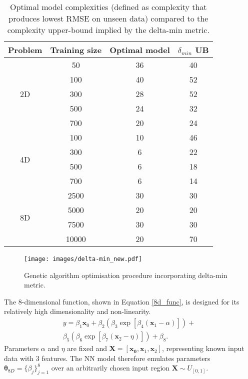\documentclass{article}
\begin{document}
\begin{table}[!h]
 	\centering
 	\small
\begin{tabular}{ |c|c|c|c| } 
\hline
Problem & Training size & Optimal model & $\delta_{min}$ UB \\
\hline
\multirow{5}{1em}{2D} & 50 & 36 & 40 \\ 
& 100 & 40 & 52 \\ 
& 300 & 28 & 52 \\
& 500 & 24 & 32 \\
& 700 & 20 & 24 \\
\hline
\multirow{4}{1em}{4D} & 100 & 10 & 46 \\ 
& 300 & 6 & 22 \\
& 500 & 6 & 18 \\
& 700 & 6 & 14 \\
\hline
\multirow{4}{1em}{8D} & 2500 & 30 & 30 \\ 
& 5000 & 20 & 20 \\
& 7500 & 30 & 30 \\
& 10000 & 20 & 70 \\
\hline
\end{tabular}
 \caption{Optimal model complexities (defined as complexity that produces lowest RMSE on unseen data) compared to the complexity upper-bound implied by the delta-min metric.}
 \label{2d_ub_vs_opt}
 \end{table}

\begin{figure*}[!ht]
	\centering
	\texttt{[image: images/delta-min\_new.pdf]}
	\caption{Genetic algorithm optimisation procedure incorporating delta-min metric.} 
	\label{genetic_algo}
\end{figure*}

The 8-dimensional function, shown in Equation \ref{8d_func}, is designed for its relatively high dimensionality and non-linearity.
\begin{equation}
  \label{8d_func}
  \begin{split}
  y = \beta_1 \mathbf{x}_0 + \beta_2(\beta_3  \exp \left[ \beta_4 (\mathbf{x}_1 - \alpha) \right]) + \ 
  \\
  \beta_5(\beta_6  \exp \left[ \beta_7 (\mathbf{x}_2 - \eta) \right]) + \beta_8.
  \end{split}
\end{equation}
Parameters $\alpha$ and $\eta$ are fixed and  $\mathbf{X} = [\mathbf{x_0}, \mathbf{x}_1, \mathbf{x}_2]$, representing known input data with 3 features. The NN model therefore emulates parameters $\boldsymbol{\theta}_{8D} = \{\beta_j\}_{j=1}^8$ over an arbitrarily chosen input region $\mathbf{X}  \sim U_{[0, 1]}$.
\end{document}
